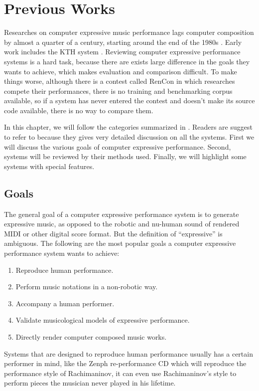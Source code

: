 \chapter{Previous Works}
Researches on computer expressive music performance lags computer composition by almost a quarter of a century, starting around the end of the 1980s \cite{THEBOOK}. Early work includes the KTH system \cite{THEBOOK}. Reviewing computer expressive performance systems is a hard task, because there are exists large difference in the goals they wants to achieve, which makes evaluation and comparison difficult. To make things worse, although there is a contest called RenCon \cite{RenCon} in which researches compete their performances, there is no training and benchmarking corpus available, so if a system has never entered the contest and doesn't make its source code available, there is no way to compare them.

In this chapter, we will follow the categories summarized in \cite{THEBOOK}. Readers are suggest to refer to \cite{THEBOOK} because they gives very detailed discussion on all the systems. First we will discuss the various goals of computer expressive performance. Second, systems will be reviewed by their methods used. Finally, we will highlight some systems with special features.

\section{Goals}
The general goal of a computer expressive performance system is to generate expressive music, as opposed to the robotic and nu-human sound of rendered MIDI or other digital score format. But the definition of ``expressive'' is ambiguous. The following are the most popular goals a computer expressive performance system wants to achieve:
\begin{enumerate}
   \item Reproduce human performance.
   \item Perform music notations in a non-robotic way.
   \item Accompany a human performer.
   \item Validate musicological models of expressive performance.
   \item Directly render computer composed music works.
\end{enumerate}

Systems that are designed to reproduce human performance usually has a certain performer in mind, like the Zenph re-performance CD \cite{zenph} which will reproduce the performance style of Rachimaninov, it can even use Rachimaninov's style to perform pieces the musician never played in his lifetime. 

